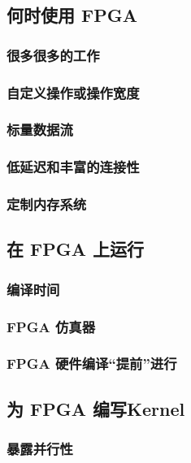 \subsection{何时使用 FPGA}

\subsubsection{很多很多的工作}

\subsubsection{自定义操作或操作宽度}

\subsubsection{标量数据流}

\subsubsection{低延迟和丰富的连接性}

\subsubsection{定制内存系统}

\subsection{在 FPGA 上运行}

\subsubsection{编译时间}

\subsubsection{FPGA 仿真器}

\subsubsection{FPGA 硬件编译“提前”进行}

\subsection{为 FPGA 编写Kernel}

\subsubsection{暴露并行性}

